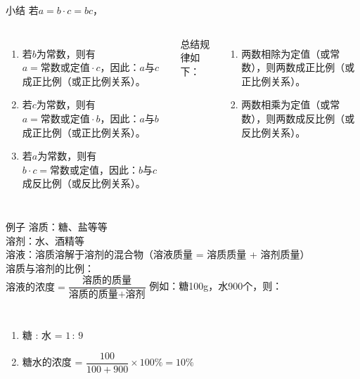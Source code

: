 \documentclass[aspectratio=169]{ctexbeamer} %
\begin{document}
\begin{frame}[t]{小结}
若$a = b \cdot c = bc$，
\begin{columns}
\begin{enumerate}[label={\arabic*.}]
\item 若$b$为常数，则有$a = \text{常数或定值} \cdot c$，因此：$a$与$c$成正比例（或正比例关系）。
\item 若$c$为常数，则有$a = \text{常数或定值} \cdot b$，因此：$a$与$b$成正比例（或正比例关系）。
\item 若$a$为常数，则有$b \cdot c = \text{常数或定值}$，因此：$b$与$c$成反比例（或反比例关系）。
\end{enumerate}
\vspace{1em}
总结规律如下：\\
\begin{enumerate}[label={\arabic*.}]
\item \alert{两数相除为定值（或常数），则两数成正比例（或正比例关系）。}
\item \alert{两数相乘为定值（或常数），则两数成反比例（或反比例关系）。}
\end{enumerate}
\end{columns}
\end{frame}

\begin{frame}[t]{例子}
溶质：糖、盐等等 \\
溶剂：水、酒精等 \\
溶液：溶质溶解于溶剂的混合物（溶液质量 = 溶质质量 + 溶剂质量）\\
溶质与溶剂的比例：\\
$\text{溶液的浓度} = \dfrac{\text{溶质的质量}}{\text{溶质的质量} + \text{溶剂}}$
\vspace{1em}
例如：糖100g，水900个，则：\\
\pause
\begin{columns}
\begin{enumerate}[label={\arabic*.}]
\item 糖 : 水 = $ 1 \, : \, 9$
\item 糖水的浓度 = $\dfrac{100}{100 + 900} \times 100\% = 10\%$
\end{enumerate}
\end{columns}
\end{frame}
\end{document}
